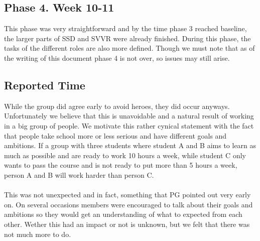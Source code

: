 \documentclass{article}
\begin{document}
    \subsection{Phase 4. Week 10-11}
        This phase was very straightforward and by the time phase 3 reached baseline, the larger parts of SSD and SVVR were already finished.
        During this phase, the tasks of the different roles are also more defined.
        Though we must note that as of the writing of this document phase 4 is not over, so issues may still arise.

    \subsection{Reported Time}
        While the group did agree early to avoid heroes, they did occur anyways.
        Unfortunately we believe that this is unavoidable and a natural result of working in a big group of people. We motivate this rather cynical statement with the fact that people take school more or less serious and have different goals and ambitions. If a group with three students where student A and B
        aims to learn as much as possible and are ready to work 10 hours a week, while student C only wants to
        pass the course and is not ready to put more than 5 hours a week, person A and B will work harder than person C.
        \\ \\
        This was not unexpected and in fact, something that PG pointed out very early on. On several occasions
        members were encouraged to talk about their goals and ambitions so they would get an understanding
        of what to expected from each other. Wether this had an impact or not is unknown, but we felt that there was not much more to do.
    
\end{document}
